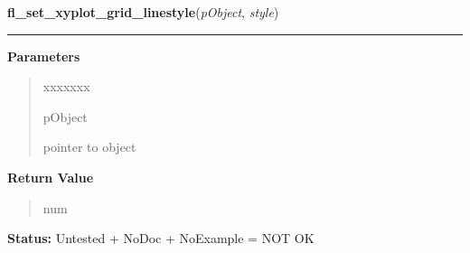 \hspace{.8\funcindent}\begin{boxedminipage}{\funcwidth}

    \raggedright \textbf{fl\_set\_xyplot\_grid\_linestyle}(\textit{pObject}, \textit{style})

    \vspace{-1.5ex}

    \rule{\textwidth}{0.5\fboxrule}
\setlength{\parskip}{2ex}
\setlength{\parskip}{1ex}
      \textbf{Parameters}
      \vspace{-1ex}

      \begin{quote}
        \begin{Ventry}{xxxxxxx}

          \item[pObject]

          pointer to object

        \end{Ventry}

      \end{quote}

      \textbf{Return Value}
    \vspace{-1ex}

      \begin{quote}
      num

      \end{quote}

\textbf{Status:} Untested + NoDoc + NoExample = NOT OK



    \end{boxedminipage}

    \label{xformslib:library:fl_set_xyplot_alphaxtics}

    \vspace{0.5ex}

